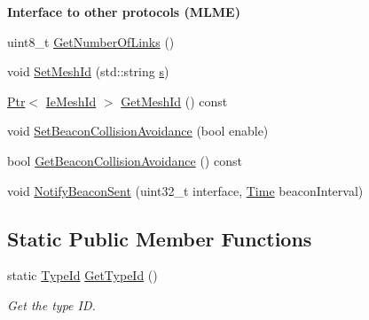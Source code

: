 \begin{Indent}{\bf Interface to other protocols (M\+L\+ME)}
\begin{DoxyCompactItemize}
uint8\+\_\+t \hyperlink{classns3_1_1dot11s_1_1PeerManagementProtocol_a9d88828b5e26f43179f522e801dafb62}{Get\+Number\+Of\+Links} ()
\item 
void \hyperlink{classns3_1_1dot11s_1_1PeerManagementProtocol_a145a10e70c88c5c6c15bbf0e749dc398}{Set\+Mesh\+Id} (std\+::string \hyperlink{generate__test__data__lte__sinr_8m_ad83eeb3a142285d1243a08c6b7026df8}{s})
\item 
\hyperlink{classns3_1_1Ptr}{Ptr}$<$ \hyperlink{classns3_1_1dot11s_1_1IeMeshId}{Ie\+Mesh\+Id} $>$ \hyperlink{classns3_1_1dot11s_1_1PeerManagementProtocol_a8d7b44ed2289329a669cb5234bb0fb30}{Get\+Mesh\+Id} () const 
\item 
void \hyperlink{classns3_1_1dot11s_1_1PeerManagementProtocol_af7f617cc0deff9bd8e97ed4c3a77eeba}{Set\+Beacon\+Collision\+Avoidance} (bool enable)
\item 
bool \hyperlink{classns3_1_1dot11s_1_1PeerManagementProtocol_ac97f472fcc281fb856f8434555cab024}{Get\+Beacon\+Collision\+Avoidance} () const 
\item 
void \hyperlink{classns3_1_1dot11s_1_1PeerManagementProtocol_a92bdb582f3c57ccf14d156947350ea43}{Notify\+Beacon\+Sent} (uint32\+\_\+t interface, \hyperlink{classns3_1_1Time}{Time} beacon\+Interval)
\end{DoxyCompactItemize}
\end{Indent}
\subsection*{Static Public Member Functions}
\begin{DoxyCompactItemize}
\item 
static \hyperlink{classns3_1_1TypeId}{Type\+Id} \hyperlink{classns3_1_1dot11s_1_1PeerManagementProtocol_a8341f80d9b79e21cf9cf6dbdd88db3e0}{Get\+Type\+Id} ()
\begin{DoxyCompactList}\small\item\em Get the type ID. \end{DoxyCompactList}\end{DoxyCompactItemize}
